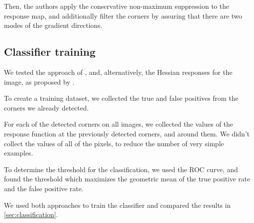Then, the authors apply the conservative non-maximum suppression to the
response map, and additionally filter the corners by assuring that there are two
modes of the gradient directions.

%
%
%
%
%

\subsection{Classifier training}\label{sub:classifier_training}

We tested the approach of \cite{geigerAutomaticCameraRange2012}, and,
alternatively, the Hessian responses for the image, as proposed by
\cite{chenNewSubPixelDetector2005}.

To create a training dataset, we collected the true and false positives from the
corners we already detected.

For each of the detected corners on all images, we collected the values of the
response function at the previously detected corners, and around them.
We didn't collect the values of all of the pixels, to reduce the number
of very simple examples.

To determine the threshold for the classification, we used the ROC curve, and
found the threshold which maximizes
the geometric mean of the true positive rate and the false positive rate.

We used both approaches to train the classifier and compared the
results in \cref{sec:classification}.


